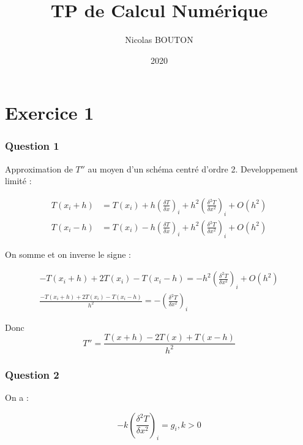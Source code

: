\documentclass[11pt]{article}
\title{TP de Calcul Numérique}
\author{Nicolas BOUTON}
\date{2020}
\begin{document}
\maketitle

\section{Exercice 1}

\subsubsection{Question 1}

Approximation de $T''$ au moyen d'un schéma centré d'ordre 2.
\vspace{5mm}
Developpement limité : 

\begin{equation*}
  \begin{split}
    T(x_i + h) & = T(x_i) + h \left(\frac{\delta T}{\delta x} \right)_i + h^2 \left(\frac{\delta^2 T}{\delta x^2} \right)_i + O(h^2) \\
    T(x_i - h) & = T(x_i) - h \left(\frac{\delta T}{\delta x} \right)_i + h^2 \left(\frac{\delta^2 T}{\delta x^2} \right)_i + O(h^2)
  \end{split}
\end{equation*}

On somme et on inverse le signe :

\begin{equation*}
  \begin{split}
    - T(x_i + h) + 2 T(x_i) - T(x_i - h) = - h^2 \left(\frac{\delta^2 T}{\delta x^2} \right)_i + O(h^2) \\
    \frac{- T(x_i + h) + 2 T(x_i) - T(x_i - h)}{h^2} = - \left(\frac{\delta^2 T}{\delta x^2} \right)_i
  \end{split}
\end{equation*}

Donc
\begin{equation*}
  T'' = \frac{T(x + h) - 2 T(x) + T(x - h)}{h^2}
\end{equation*}

\subsubsection{Question 2}

On a :

\begin{equation*}
  - k \left( \frac{\delta^2 T}{\delta x^2} \right)_i = g_i, k > 0
\end{equation*}
\end{document}
